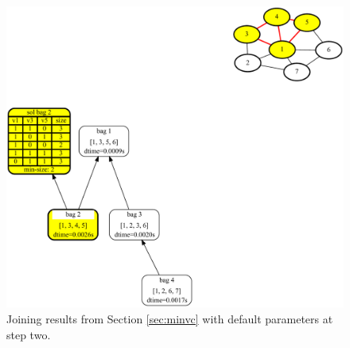 \documentclass[a4paper, 12pt, bibliography=totoc]{scrartcl}
\begin{document}
\begin{figure}[H]
	\centering
	\includegraphics[width=\linewidth,height=0.6\textheight,keepaspectratio]{images/SVGJOIN/default2.pdf}
	\caption[Joining results from Section \ref{sec:minvc} with default parameters at step two]{Joining results from Section \ref{sec:minvc} with default parameters at step two.}
	\label{fig:joindefault}
\end{figure}
\end{document}

